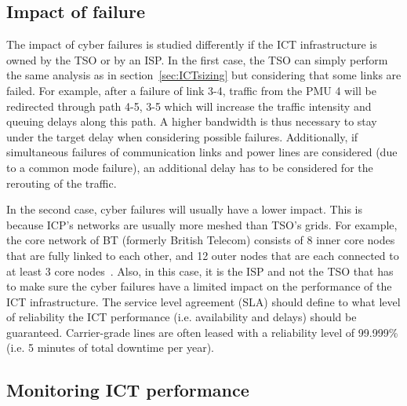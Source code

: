
\subsection{Impact of failure}
\label{sec:ICTfailure}

The impact of cyber failures is studied differently if the ICT infrastructure is owned by the TSO or by an ISP. In the first case, the TSO can simply perform the same analysis as in section~\ref{sec:ICTsizing} but considering that some links are failed. For example, after a failure of link 3-4, traffic from the PMU 4 will be redirected through path 4-5, 3-5 which will increase the traffic intensity and queuing delays along this path. A higher bandwidth is thus necessary to stay under the target delay when considering possible failures. Additionally, if simultaneous failures of communication links and power lines are considered (due to a common mode failure), an additional delay has to be considered for the rerouting of the traffic.

In the second case, cyber failures will usually have a lower impact. This is because ICP's networks are usually more meshed than TSO's grids. For example, the core network of BT (formerly British Telecom) consists of 8 inner core nodes that are fully linked to each other, and 12 outer nodes that are each connected to at least 3 core nodes~\cite{BTnetwork}. Also, in this case, it is the ISP and not the TSO that has to make sure the cyber failures have a limited impact on the performance of the ICT infrastructure. The service level agreement (SLA) should define to what level of reliability the ICT performance (i.e. availability and delays) should be guaranteed. Carrier-grade lines are often leased with a reliability level of 99.999\% (i.e. 5 minutes of total downtime per year).

\subsection{Monitoring ICT performance}
\label{sec:ICTmonitoring}

